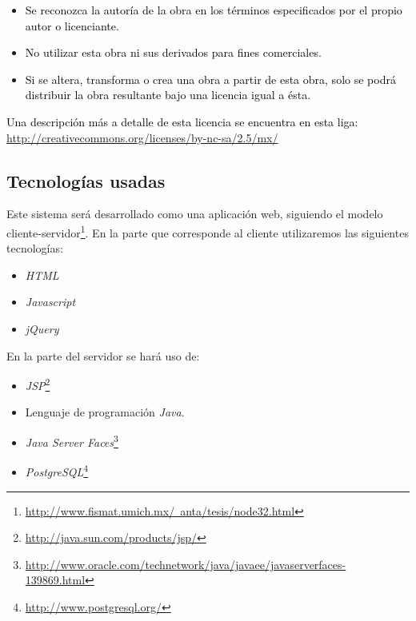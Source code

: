 \documentclass[11pt,letterpaper,titlepage]{article}
\begin{document}
\begin{itemize}
 \item \textcolor{black}{Se reconozca la autor\'ia de la obra en los t\'erminos especificados por el propio autor o licenciante.}
 \item \textcolor{black}{No utilizar esta obra ni sus derivados para fines comerciales.}
 \item \textcolor{black}{Si se altera, transforma o crea una obra a partir de esta obra, solo se podr\'a distribuir la obra resultante bajo una licencia igual a \'esta.}
\end{itemize}

\textcolor{black}{Una descripci\'on m\'as a detalle de esta licencia se encuentra en esta liga: \\\href{http://creativecommons.org/licenses/by-nc-sa/2.5/mx/}{http://creativecommons.org/licenses/by-nc-sa/2.5/mx/}}
 



\subsection{Tecnolog\'ias usadas}
Este sistema ser\'a desarrollado como una aplicaci\'on web, siguiendo el modelo cliente-servidor\footnote{\href{http://www.fismat.umich.mx/~anta/tesis/node32.html}{http://www.fismat.umich.mx/~anta/tesis/node32.html}}. En la parte que corresponde al cliente utilizaremos las siguientes tecnolog\'ias:


\begin{itemize}
 \item \textit{HTML}
 \item \textit{Javascript}
 \item \textit{jQuery}
\end{itemize}
En la parte del servidor se har\'a uso de:
\begin{itemize}
 \item \textit{JSP}\footnote{\href{http://java.sun.com/products/jsp/}{http://java.sun.com/products/jsp/}}

 \item Lenguaje de programaci\'on \textit{Java}.
 \item \textit{Java Server Faces}\footnote{\href{http://www.oracle.com/technetwork/java/javaee/javaserverfaces-139869.html}{http://www.oracle.com/technetwork/java/javaee/javaserverfaces-139869.html}}
 \item \textit{PostgreSQL}\footnote{\href{http://www.postgresql.org/}{http://www.postgresql.org/}}
\end{itemize}
\end{document}
